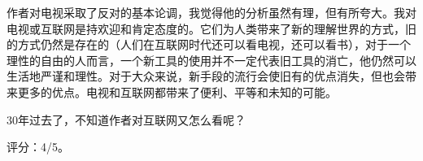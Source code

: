作者对电视采取了反对的基本论调，我觉得他的分析虽然有理，但有所夸大。我对电视或互联网是持欢迎和肯定态度的。它们为人类带来了新的理解世界的方式，旧的方式仍然是存在的（人们在互联网时代还可以看电视，还可以看书），对于一个理性的自由的人而言，一个新工具的使用并不一定代表旧工具的消亡，他仍然可以生活地严谨和理性。对于大众来说，新手段的流行会使旧有的优点消失，但也会带来更多的优点。电视和互联网都带来了便利、平等和未知的可能。

30年过去了，不知道作者对互联网又怎么看呢？

评分：4/5。